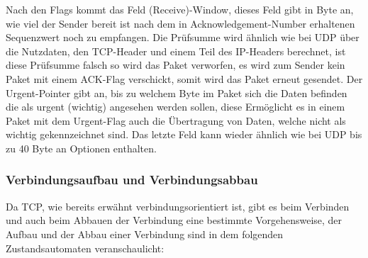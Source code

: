\documentclass[a4paper,14pt,headsepline]{scrartcl}
\begin{document}
Nach den Flags kommt das Feld (Receive)-Window, dieses Feld gibt in Byte an, wie viel der Sender bereit ist nach dem in Acknowledgement-Number erhaltenen Sequenzwert noch zu empfangen. Die Prüfsumme wird ähnlich wie bei UDP über die Nutzdaten, den TCP-Header und einem Teil des IP-Headers berechnet, ist diese Prüfsumme falsch so wird das Paket verworfen, es wird zum Sender kein Paket mit einem ACK-Flag verschickt, somit wird das Paket erneut gesendet. Der Urgent-Pointer gibt an, bis zu welchem Byte im Paket sich die Daten befinden die als urgent (wichtig) angesehen werden sollen, diese Ermöglicht es in einem Paket mit dem Urgent-Flag auch die Übertragung von Daten, welche nicht als wichtig gekennzeichnet sind. Das letzte Feld kann wieder ähnlich wie bei UDP bis zu 40 Byte an Optionen enthalten.

\subsubsection*{Verbindungsaufbau und Verbindungsabbau}
Da TCP, wie bereits erwähnt verbindungsorientiert ist, gibt es beim Verbinden und auch beim Abbauen der Verbindung eine bestimmte Vorgehensweise, der Aufbau und der Abbau einer Verbindung sind in dem folgenden Zustandsautomaten veranschaulicht:

\begin{figure}[h]
\begin{center}
\end{center}
\end{figure}
\end{document}
